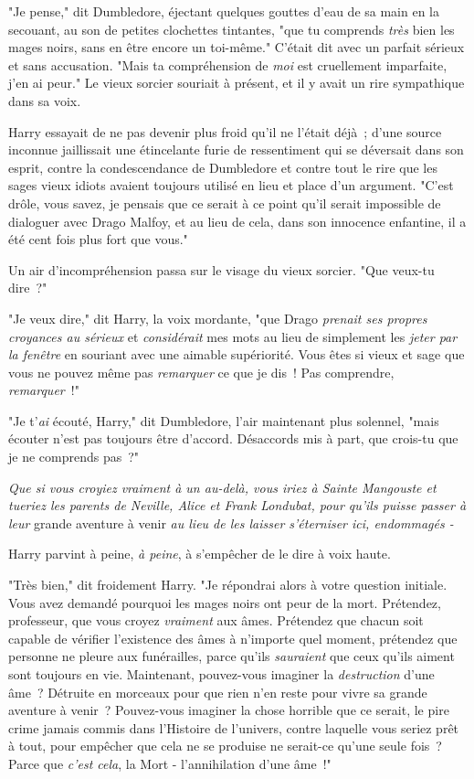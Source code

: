 "Je pense," dit Dumbledore, éjectant quelques gouttes d'eau de sa main en la secouant, au son de petites clochettes tintantes, "que tu comprends \emph{très} bien les mages noirs, sans en être encore un toi-même." C'était dit avec un parfait sérieux et sans accusation. "Mais ta compréhension de \emph{moi} est cruellement imparfaite, j'en ai peur." Le vieux sorcier souriait à présent, et il y avait un rire sympathique dans sa voix.

Harry essayait de ne pas devenir plus froid qu'il ne l'était déjà~; d'une source inconnue jaillissait une étincelante furie de ressentiment qui se déversait dans son esprit, contre la condescendance de Dumbledore et contre tout le rire que les sages vieux idiots avaient toujours utilisé en lieu et place d'un argument. "C'est drôle, vous savez, je pensais que ce serait à ce point qu'il serait impossible de dialoguer avec Drago Malfoy, et au lieu de cela, dans son innocence enfantine, il a été cent fois plus fort que vous."

Un air d'incompréhension passa sur le visage du vieux sorcier. "Que veux-tu dire~?"

"Je veux dire," dit Harry, la voix mordante, "que Drago \emph{prenait ses propres croyances au sérieux} et \emph{considérait} mes mots au lieu de simplement les \emph{jeter par la fenêtre} en souriant avec une aimable supériorité. Vous êtes si vieux et sage que vous ne pouvez même pas \emph{remarquer} ce que je dis~! Pas comprendre, \emph{remarquer}~!"

"Je t'\emph{ai} écouté, Harry," dit Dumbledore, l'air maintenant plus solennel, "mais écouter n'est pas toujours être d'accord. Désaccords mis à part, que crois-tu que je ne comprends pas~?"

\emph{Que si vous croyiez vraiment à un au-delà, vous iriez à Sainte Mangouste et tueriez les parents de Neville, Alice et Frank Londubat, pour qu'ils puisse passer à leur} grande aventure à venir \emph{au lieu de les laisser s'éterniser ici, endommagés -}

Harry parvint à peine, \emph{à peine}, à s'empêcher de le dire à voix haute.

"Très bien," dit froidement Harry. "Je répondrai alors à votre question initiale. Vous avez demandé pourquoi les mages noirs ont peur de la mort. Prétendez, professeur, que vous croyez \emph{vraiment} aux âmes. Prétendez que chacun soit capable de vérifier l'existence des âmes à n'importe quel moment, prétendez que personne ne pleure aux funérailles, parce qu'ils \emph{sauraient} que ceux qu'ils aiment sont toujours en vie. Maintenant, pouvez-vous imaginer la \emph{destruction} d'une âme~? Détruite en morceaux pour que rien n'en reste pour vivre sa grande aventure à venir~? Pouvez-vous imaginer la chose horrible que ce serait, le pire crime jamais commis dans l'Histoire de l'univers, contre laquelle vous seriez prêt à tout, pour empêcher que cela ne se produise ne serait-ce qu'une seule fois~? Parce que \emph{c'est cela}, la Mort - l'annihilation d'une âme~!"

